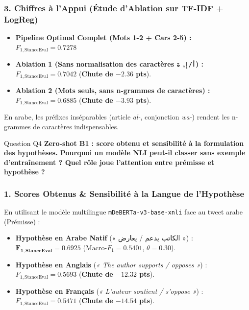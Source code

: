 \documentclass[11pt,a4paper]{article}
\begin{document}
\subsubsection*{3. Chiffres à l'Appui (Étude d'Ablation sur TF-IDF + LogReg)}
\begin{itemize}[noitemsep]
    \item \textbf{Pipeline Optimal Complet (Mots 1-2 + Cars 2-5) :} $F_{1,\text{StanceEval}} = \mathbf{0.7278}$
    \item \textbf{Ablation 1 (Sans normalisation des caractères \texttt{أ/إ}, \texttt{ة}) :} $F_{1,\text{StanceEval}} = 0.7042$ (\textbf{Chute de $-2.36$ pts}).
    \item \textbf{Ablation 2 (Mots seuls, sans n-grammes de caractères) :} $F_{1,\text{StanceEval}} = 0.6885$ (\textbf{Chute de $-3.93$ pts}).
\end{itemize}
En arabe, les préfixes inséparables (article \textit{al-}, conjonction \textit{wa-}) rendent les n-grammes de caractères indispensables.

\vspace{0.3cm}

\begin{questionbox}{Question Q4}
\textbf{Zero-shot B1 : score obtenu et sensibilité à la formulation des hypothèses. Pourquoi un modèle NLI peut-il classer sans exemple d'entraînement ? Quel rôle joue l'attention entre prémisse et hypothèse ?}
\end{questionbox}

\subsubsection*{1. Scores Obtenus \& Sensibilité à la Langue de l'Hypothèse}
En utilisant le modèle multilingue \texttt{mDeBERTa-v3-base-xnli} face au tweet arabe (Prémisse) :
\begin{itemize}[noitemsep]
    \item \textbf{Hypothèse en Arabe Natif} (« الكاتب يدعم / يعارض ») : $\mathbf{F_{1,\text{StanceEval}} = 0.6925}$ \quad ($\text{Macro-}F_1 = 0.5401$, $\theta = 0.30$).
    \item \textbf{Hypothèse en Anglais} (\textit{« The author supports / opposes »}) : $F_{1,\text{StanceEval}} = 0.5693$ (\textbf{Chute de $-12.32$ pts}).
    \item \textbf{Hypothèse en Français} (\textit{« L'auteur soutient / s'oppose »}) : $F_{1,\text{StanceEval}} = 0.5471$ (\textbf{Chute de $-14.54$ pts}).
\end{itemize}
\end{document}
